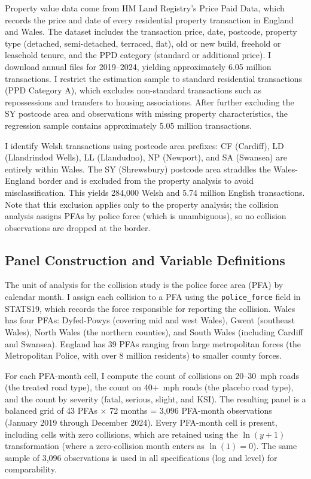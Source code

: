 \documentclass[12pt]{article}
\begin{document}
Property value data come from HM Land Registry's Price Paid Data, which records the price and date of every residential property transaction in England and Wales. The dataset includes the transaction price, date, postcode, property type (detached, semi-detached, terraced, flat), old or new build, freehold or leasehold tenure, and the PPD category (standard or additional price). I download annual files for 2019--2024, yielding approximately 6.05 million transactions. I restrict the estimation sample to standard residential transactions (PPD Category A), which excludes non-standard transactions such as repossessions and transfers to housing associations. After further excluding the SY postcode area and observations with missing property characteristics, the regression sample contains approximately 5.05 million transactions.

I identify Welsh transactions using postcode area prefixes: CF (Cardiff), LD (Llandrindod Wells), LL (Llandudno), NP (Newport), and SA (Swansea) are entirely within Wales. The SY (Shrewsbury) postcode area straddles the Wales-England border and is excluded from the property analysis to avoid misclassification. This yields 284,000 Welsh and 5.74 million English transactions. Note that this exclusion applies only to the property analysis; the collision analysis assigns PFAs by police force (which is unambiguous), so no collision observations are dropped at the border.

\subsection{Panel Construction and Variable Definitions}

The unit of analysis for the collision study is the police force area (PFA) by calendar month. I assign each collision to a PFA using the \texttt{police\_force} field in STATS19, which records the force responsible for reporting the collision. Wales has four PFAs: Dyfed-Powys (covering mid and west Wales), Gwent (southeast Wales), North Wales (the northern counties), and South Wales (including Cardiff and Swansea). England has 39 PFAs ranging from large metropolitan forces (the Metropolitan Police, with over 8 million residents) to smaller county forces.

For each PFA-month cell, I compute the count of collisions on 20--30~mph roads (the treated road type), the count on 40+~mph roads (the placebo road type), and the count by severity (fatal, serious, slight, and KSI). The resulting panel is a balanced grid of 43 PFAs $\times$ 72 months = 3,096 PFA-month observations (January 2019 through December 2024). Every PFA-month cell is present, including cells with zero collisions, which are retained using the $\ln(y + 1)$ transformation (where a zero-collision month enters as $\ln(1) = 0$). The same sample of 3,096 observations is used in all specifications (log and level) for comparability.
\end{document}
